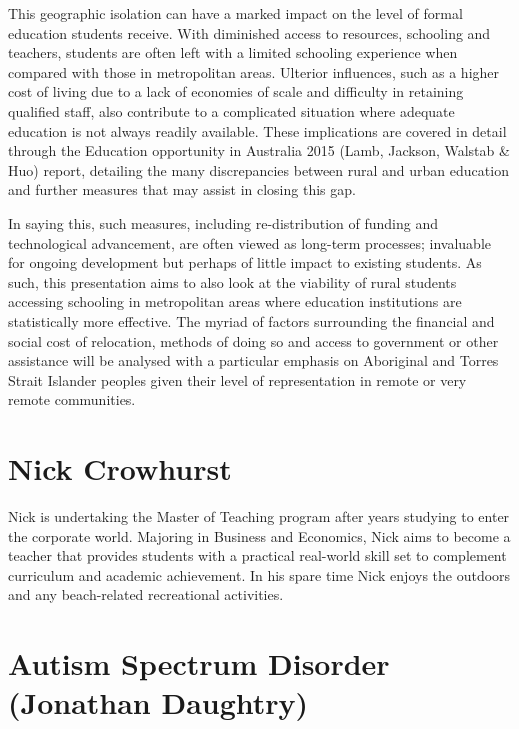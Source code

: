\documentclass[twoside,12pt,a4paper,notitlepage]{memoir}
\begin{document}
 
This geographic isolation can have a marked impact on the level of formal education students receive. With diminished access to resources, schooling and teachers, students are often left with a limited schooling experience when compared with those in metropolitan areas. Ulterior influences, such as a higher cost of living due to a lack of economies of scale and difficulty in retaining qualified staff, also contribute to a complicated situation where adequate education is not always readily available. These implications are covered in detail through the Education opportunity in Australia 2015 (Lamb, Jackson, Walstab \& Huo) report, detailing the many discrepancies between rural and urban education and further measures that may assist in closing this gap.
 
 
In saying this, such measures, including re-distribution of funding and technological advancement, are often viewed as long-term processes; invaluable for ongoing development but perhaps of little impact to existing students. As such, this presentation aims to also look at the viability of rural students accessing schooling in metropolitan areas where education institutions are statistically more effective. The myriad of factors surrounding the financial and social cost of relocation, methods of doing so and access to government or other assistance will be analysed with a particular emphasis on Aboriginal and Torres Strait Islander peoples given their level of representation in remote or very remote communities.

\section*{Nick Crowhurst}

Nick is undertaking the Master of Teaching program after years studying to enter the corporate world. Majoring in Business and Economics, Nick aims to become a teacher that provides students with a practical real-world skill set to complement curriculum and academic achievement. In his spare time Nick enjoys the outdoors and any beach-related recreational activities. 



\pagebreak
\section*{Autism Spectrum Disorder (Jonathan Daughtry)}
\label{aut:daughtry}
\end{document}
